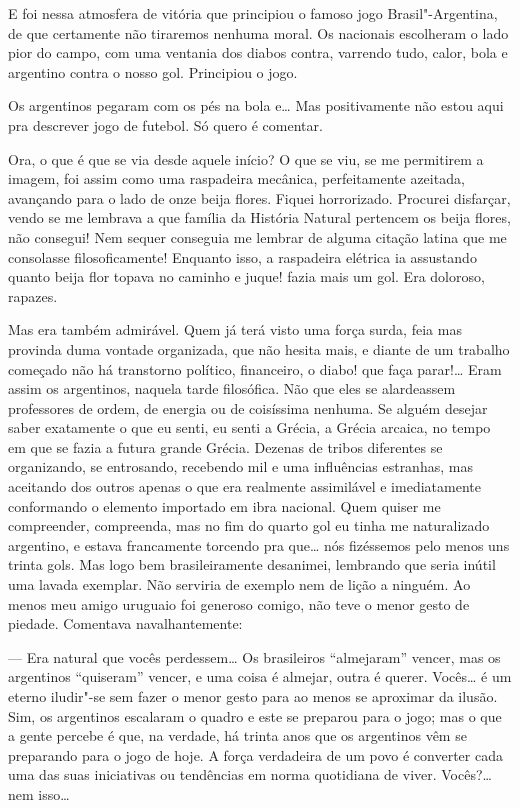 E foi nessa atmosfera de vitória que principiou o famoso jogo
Brasil"-Argentina, de que certamente não tiraremos nenhuma moral. Os
nacionais escolheram o lado pior do campo, com uma ventania dos diabos
contra, varrendo tudo, calor, bola e argentino contra o nosso gol.
Principiou o jogo.

Os argentinos pegaram com os pés na bola e\ldots{} Mas positivamente não
estou aqui pra descrever jogo de futebol. Só quero é comentar.

Ora, o que é que se via desde aquele início? O que se viu, se me
permitirem a imagem, foi assim como uma raspadeira mecânica,
perfeitamente azeitada, avançando para o lado de onze beija flores.
Fiquei horrorizado. Procurei disfarçar, vendo se me lembrava a que
família da História Natural pertencem os beija flores, não consegui! Nem
sequer conseguia me lembrar de alguma citação latina que me consolasse
filosoficamente! Enquanto isso, a raspadeira elétrica ia assustando
quanto beija flor topava no caminho e juque! fazia mais um gol. Era
doloroso, rapazes.

Mas era também admirável. Quem já terá visto uma força surda, feia mas
provinda duma vontade organizada, que não hesita mais, e diante de um
trabalho começado não há transtorno político, financeiro, o diabo! que
faça parar!\ldots{} Eram assim os argentinos, naquela tarde filosófica. Não
que eles se alardeassem professores de ordem, de energia ou de
coisíssima nenhuma. Se alguém desejar saber exatamente o que eu senti,
eu senti a Grécia, a Grécia arcaica, no tempo em que se fazia a futura
grande Grécia. Dezenas de tribos diferentes se organizando, se
entrosando, recebendo mil e uma influências estranhas, mas aceitando dos
outros apenas o que era realmente assimilável e imediatamente
conformando o elemento importado em ibra nacional. Quem quiser me
compreender, compreenda, mas no fim do quarto gol eu tinha me
naturalizado argentino, e estava francamente torcendo pra que\ldots{} nós
fizéssemos pelo menos uns trinta gols. Mas logo bem brasileiramente
desanimei, lembrando que seria inútil uma lavada exemplar. Não serviria
de exemplo nem de lição a ninguém. Ao menos meu amigo uruguaio foi
generoso comigo, não teve o menor gesto de piedade. Comentava
navalhantemente:

--- Era natural que vocês perdessem\ldots{} Os brasileiros ``almejaram''
vencer, mas os argentinos ``quiseram'' vencer, e uma coisa é almejar,
outra é querer. Vocês\ldots{} é um eterno iludir"-se sem fazer o menor gesto
para ao menos se aproximar da ilusão. Sim, os argentinos escalaram o
quadro e este se preparou para o jogo; mas o que a gente percebe é que,
na verdade, há trinta anos que os argentinos vêm se preparando para o
jogo de hoje. A força verdadeira de um povo é converter cada uma das
suas iniciativas ou tendências em norma quotidiana de viver. Vocês?\ldots{}
nem isso\ldots{}

